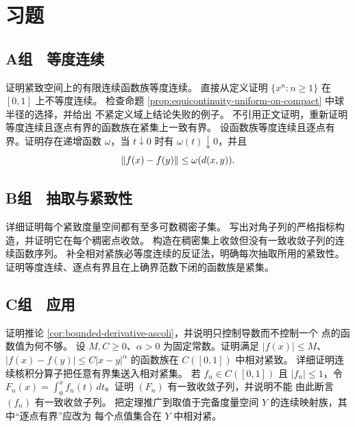 \section*{习题}

\subsection*{A组　等度连续}
\begin{enumerate}[label=\textbf{\thechapter.\arabic*.}]
 证明紧致空间上的有限连续函数族等度连续。
 直接从定义证明 $\{x^n:n\ge1\}$ 在 $[0,1]$ 上不等度连续。
 检查命题 \ref{prop:equicontinuity-uniform-on-compact} 中球半径的选择，并给出
 不紧定义域上结论失败的例子。
 不引用正文证明，重新证明等度连续且逐点有界的函数族在紧集上一致有界。
 设函数族等度连续且逐点有界。证明存在递增函数 $\omega$，当
 $t\downarrow0$ 时有 $\omega(t)\downarrow0$，并且
 \[
  \left\lVert f(x)-f(y)\right\rVert\le\omega(d(x,y)).
 \]
\end{enumerate}

\subsection*{B组　抽取与紧致性}
\begin{enumerate}[label=\textbf{\thechapter.\arabic*.},resume]
 详细证明每个紧致度量空间都有至多可数稠密子集。
 写出对角子列的严格指标构造，并证明它在每个稠密点收敛。
 构造在稠密集上收敛但没有一致收敛子列的连续函数序列。
 补全相对紧族必等度连续的反证法，明确每次抽取所用的紧致性。
 证明等度连续、逐点有界且在上确界范数下闭的函数族是紧集。
\end{enumerate}

\subsection*{C组　应用}
\begin{enumerate}[label=\textbf{\thechapter.\arabic*.},resume]
 证明推论 \ref{cor:bounded-derivative-ascoli}，并说明只控制导数而不控制一个
 点的函数值为何不够。
 设 $M,C\ge0$、$\alpha>0$ 为固定常数。证明满足
 $|f(x)|\le M$、$|f(x)-f(y)|\le C|x-y|^\alpha$ 的函数族在
 $C([0,1])$ 中相对紧致。
 详细证明连续核积分算子把任意有界集送入相对紧集。
 若 $f_n\in C([0,1])$ 且 $|f_n|\le1$，令
 $F_n(x)=\int_0^xf_n(t)\,dt$。证明 $(F_n)$ 有一致收敛子列，并说明不能
 由此断言 $(f_n)$ 有一致收敛子列。
 把定理推广到取值于完备度量空间 $Y$ 的连续映射族，其中“逐点有界”应改为
 每个点值集合在 $Y$ 中相对紧。
\end{enumerate}
